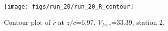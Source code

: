 \begin{figure}[H]
\centering
\texttt{[image: figs/run\_20/run\_20\_R\_contour]}
\caption{Contour plot of $\overline{r}$ at $z/c$=6.97, $V_{free}$=33.39, station 2.}
\label{fig:run_20_R_contour}
\end{figure}


